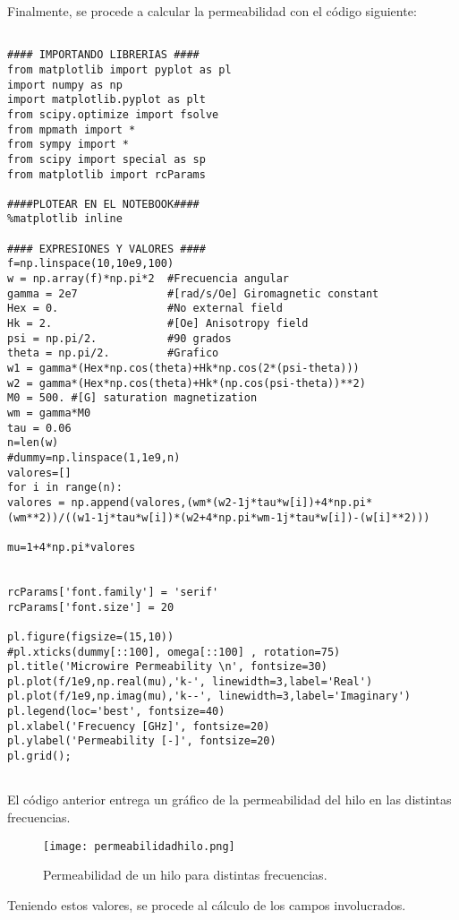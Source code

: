 \documentclass[12pt,letterpaper]{report}
\numberwithin{equation}{section}
\begin{document}
Finalmente, se procede a calcular la permeabilidad con el código siguiente:

\begin{lstlisting}

#### IMPORTANDO LIBRERIAS ####
from matplotlib import pyplot as pl
import numpy as np
import matplotlib.pyplot as plt
from scipy.optimize import fsolve
from mpmath import *
from sympy import *
from scipy import special as sp
from matplotlib import rcParams

####PLOTEAR EN EL NOTEBOOK####
%matplotlib inline

#### EXPRESIONES Y VALORES ####
f=np.linspace(10,10e9,100) 
w = np.array(f)*np.pi*2  #Frecuencia angular
gamma = 2e7              #[rad/s/Oe] Giromagnetic constant
Hex = 0.                 #No external field
Hk = 2.                  #[Oe] Anisotropy field
psi = np.pi/2.           #90 grados
theta = np.pi/2.         #Grafico
w1 = gamma*(Hex*np.cos(theta)+Hk*np.cos(2*(psi-theta)))
w2 = gamma*(Hex*np.cos(theta)+Hk*(np.cos(psi-theta))**2)
M0 = 500. #[G] saturation magnetization
wm = gamma*M0
tau = 0.06               
n=len(w)
#dummy=np.linspace(1,1e9,n)
valores=[]
for i in range(n):
valores = np.append(valores,(wm*(w2-1j*tau*w[i])+4*np.pi*(wm**2))/((w1-1j*tau*w[i])*(w2+4*np.pi*wm-1j*tau*w[i])-(w[i]**2)))

mu=1+4*np.pi*valores


rcParams['font.family'] = 'serif'
rcParams['font.size'] = 20

pl.figure(figsize=(15,10))
#pl.xticks(dummy[::100], omega[::100] , rotation=75)
pl.title('Microwire Permeability \n', fontsize=30)
pl.plot(f/1e9,np.real(mu),'k-', linewidth=3,label='Real')
pl.plot(f/1e9,np.imag(mu),'k--', linewidth=3,label='Imaginary')
pl.legend(loc='best', fontsize=40)
pl.xlabel('Frecuency [GHz]', fontsize=20)
pl.ylabel('Permeability [-]', fontsize=20)
pl.grid();


\end{lstlisting}

El código anterior entrega un gráfico de la permeabilidad del hilo en las distintas frecuencias.

\begin{figure}[H]
	\centering\texttt{[image: permeabilidadhilo.png]}\\
	\caption{Permeabilidad de un hilo para distintas frecuencias.}
	\label{fig:permeabilidadhilo}
\end{figure} 


Teniendo estos valores, se procede al cálculo de los campos involucrados.
\end{document}
